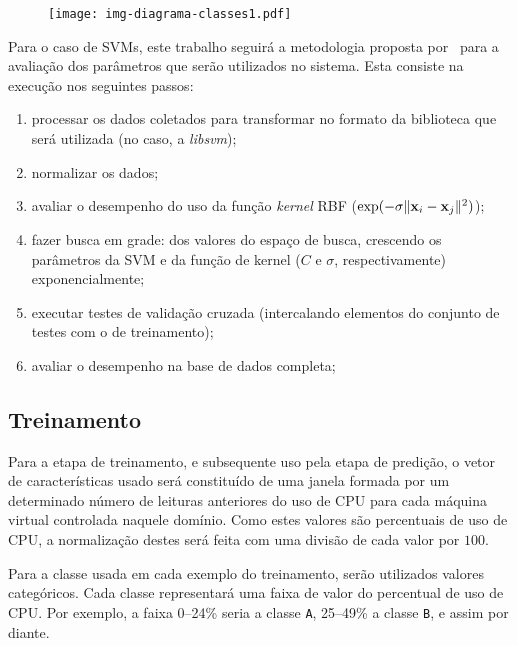 \begin{figure}[htp]
\centering
\texttt{[image: img-diagrama-classes1.pdf]}
\label{fig:diagramaclasses1}
\end{figure}


Para o caso de SVMs, este trabalho seguirá a metodologia proposta
por~ para a avaliação dos parâmetros que serão
utilizados no sistema. Esta consiste na execução nos seguintes passos:
\begin{enumerate}
  \item processar os dados coletados para transformar no formato da biblioteca
        que será utilizada (no caso, a \emph{libsvm});
  \item normalizar os dados;
  \item avaliar o desempenho do uso da função \emph{kernel} RBF
        ($\exp(-\sigma\lVert \mathbf{x}_i-\mathbf{x}_j \rVert^2)$);
  \item fazer busca em grade: dos valores do espaço de busca, crescendo os
	 parâmetros da SVM e da função de kernel ($C$ e $\sigma$,
         respectivamente) exponencialmente;
  \item executar testes de validação cruzada (intercalando elementos do conjunto
        de testes com o de treinamento);
 \item avaliar o desempenho na base de dados completa;
\end{enumerate}

\subsection{Treinamento}

Para a etapa de treinamento, e subsequente uso pela etapa de predição, o
vetor de características usado será constituído de uma janela
formada por um determinado número de leituras anteriores do uso de CPU para
cada máquina virtual controlada naquele domínio. Como estes valores são
percentuais de uso de CPU, a normalização destes será feita com uma divisão
de cada valor por $100$.

Para a classe usada em cada exemplo do treinamento, serão utilizados
valores categóricos. Cada classe representará uma faixa de valor do
percentual de uso de CPU. Por exemplo, a faixa 0--24\% seria a classe
\texttt{A}, 25--49\% a classe \texttt{B}, e assim por diante.

